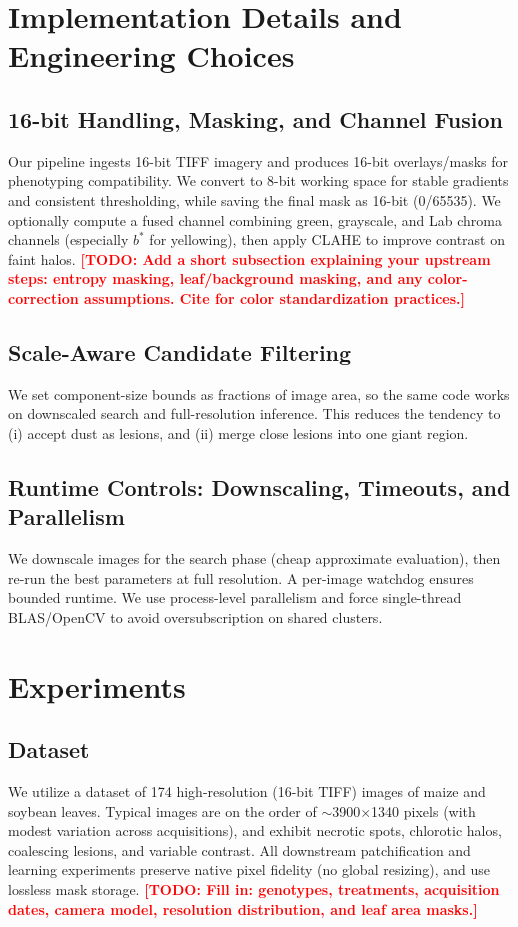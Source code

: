 \documentclass[journal]{IEEEtran}
\newcommand{\TODO}[1]{\textcolor{red}{\textbf{[TODO: #1]}}}
\begin{document}
\section{Implementation Details and Engineering Choices}

\subsection{16-bit Handling, Masking, and Channel Fusion}
Our pipeline ingests 16-bit TIFF imagery and produces 16-bit overlays/masks for phenotyping compatibility.
We convert to 8-bit working space for stable gradients and consistent thresholding, while saving the final mask as 16-bit (0/65535).
We optionally compute a fused channel combining green, grayscale, and Lab chroma channels (especially $b^\ast$ for yellowing), then apply CLAHE to improve contrast on faint halos.
\TODO{Add a short subsection explaining your upstream steps: entropy masking, leaf/background masking, and any color-correction assumptions. Cite \cite{berry2018color} for color standardization practices.}

\subsection{Scale-Aware Candidate Filtering}
We set component-size bounds as fractions of image area, so the same code works on downscaled search and full-resolution inference. This reduces the tendency to (i) accept dust as lesions, and (ii) merge close lesions into one giant region.

\subsection{Runtime Controls: Downscaling, Timeouts, and Parallelism}
We downscale images for the search phase (cheap approximate evaluation), then re-run the best parameters at full resolution. A per-image watchdog ensures bounded runtime. We use process-level parallelism and force single-thread BLAS/OpenCV to avoid oversubscription on shared clusters.

\section{Experiments}

\subsection{Dataset}
We utilize a dataset of 174 high-resolution (16-bit TIFF) images of maize and soybean leaves.
Typical images are on the order of $\sim$3900$\times$1340 pixels (with modest variation across acquisitions), and exhibit necrotic spots, chlorotic halos, coalescing lesions, and variable contrast.
All downstream patchification and learning experiments preserve native pixel fidelity (no global resizing), and use lossless mask storage.
\TODO{Fill in: genotypes, treatments, acquisition dates, camera model, resolution distribution, and leaf area masks.}
\end{document}
